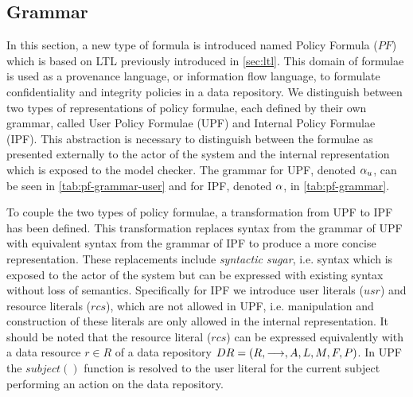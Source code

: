 \subsection{Grammar}\label{sec:grammar}
In this section, a new type of formula is introduced named Policy Formula ($PF$) which is based on LTL previously introduced in \autoref{sec:ltl}. This domain of formulae is used as a provenance language, or information flow language, to formulate confidentiality and integrity policies in a data repository. We distinguish between two types of representations of policy formulae, each defined by their own grammar, called User Policy Formulae (UPF) and Internal Policy Formulae (IPF). This abstraction is necessary to distinguish between the formulae as presented externally to the actor of the system and the internal representation which is exposed to the model checker. The grammar for UPF, denoted $\alpha_u$, can be seen in \autoref{tab:pf-grammar-user} and for IPF, denoted $\alpha$, in \autoref{tab:pf-grammar}.




To couple the two types of policy formulae, a transformation from UPF to IPF has been defined. This transformation replaces syntax from the grammar of UPF with equivalent syntax from the grammar of IPF to produce a more concise representation. These replacements include \emph{syntactic sugar}, i.e. syntax which is exposed to the actor of the system but can be expressed with existing syntax without loss of semantics. Specifically for IPF we introduce user literals ($usr$) and resource literals ($rcs$), which are not allowed in UPF, i.e. manipulation and construction of these literals are only allowed in the internal representation. It should be noted that the resource literal ($rcs$) can be expressed equivalently with a data resource $r \in R$ of a data repository $DR= \left( R, \longrightarrow, A, L, M, F, P \right)$. In UPF the $subject()$ function is resolved to the user literal for the current subject performing an action on the data repository.

